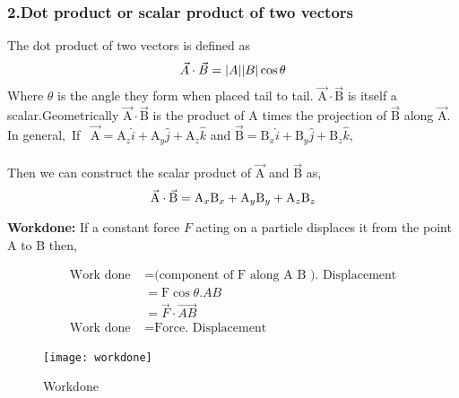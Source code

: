 \subsubsection{\large{2}.Dot product or scalar product of two vectors}
The dot product of two vectors is defined as
\begin{equation}
$$\vec{A} \cdot \vec{B}=|A| | B| \cos \theta$$
\end{equation}
Where $\theta$ is the angle they form when placed tail to tail. $\vec{\mathrm{A}} \cdot \vec{\mathrm B}$ is itself a scalar.Geometrically $\vec{\mathrm A} \cdot \vec{\mathrm B}$ is the product of $\mathrm A$ times the projection of $\vec{\mathrm B}$ along $\vec{\mathrm A}$.
\\\newline In general,\ If \ $\vec{\mathrm A}=\mathrm A_{z} \hat{i}+\mathrm A_{y} \hat{j}+\mathrm A_{z} \hat{k}$ and $\vec{\mathrm B}=\mathrm B_{x} \hat{i}+\mathrm B_{y} \hat{j}+\mathrm B_{z} \hat{k},$\\\\ Then we can construct the scalar product of $\vec{\mathrm A}$ and $\vec{\mathrm B}$ as,
\begin{equation}
$$\vec{\mathrm A} \cdot \vec{ \mathrm B}=\mathrm A_{x} \mathrm B_{x}+\mathrm A_{y} \mathrm B_{y}+\mathrm A_{z} \mathrm B_{z}$$
\end{equation}  
\begin{example}\textbf{Workdone:}
	If a constant force $F$ acting on a particle displaces it from the point A to B then,\\
	\begin{minipage}{0.45\textwidth}
		\begin{align*}
		\text{Work done} &=\text{(component of F along A B ). Displacement}\\
		&=\mathrm{F} \cos \theta . A B \\
		&=\vec{F} \cdot \overrightarrow{A B}\\
		\text{Work done }&=\text{Force. Displacement}
		\end{align*}
	\end{minipage}
	\begin{minipage}{0.45\textwidth}
	\begin{figure}[H]
		\begin{center}
			\texttt{[image: workdone]}
		\end{center}
		\caption{Workdone}
	\end{figure}
\end{minipage}
\end{example}
